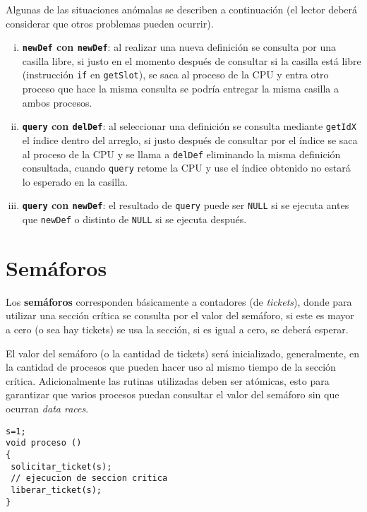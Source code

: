 Algunas de las situaciones anómalas se describen a continuación (el lector
deberá considerar que otros problemas pueden ocurrir).

\begin{enumerate}[i.]

\item \textbf{\texttt{newDef} con \texttt{newDef}}: al realizar una nueva
definición se consulta por una casilla libre, si justo en el momento después de
consultar si la casilla está libre (instrucción \texttt{if} en
\texttt{getSlot}), se saca al proceso de la CPU y entra otro proceso que hace la
misma consulta se podría entregar la misma casilla a ambos procesos.

\item \textbf{\texttt{query} con \texttt{delDef}}: al seleccionar una
definición se consulta mediante \texttt{getIdX} el índice dentro del arreglo, si
justo después de consultar por el índice se saca al proceso de la CPU y se llama
a \texttt{delDef} eliminando la misma definición consultada, cuando
\texttt{query} retome la CPU y use el índice obtenido no estará lo esperado en
la casilla.

\item \textbf{\texttt{query} con \texttt{newDef}}: el resultado de
\texttt{query} puede ser \texttt{NULL} si se ejecuta antes que \texttt{newDef} o
distinto de \texttt{NULL} si se ejecuta después.

\end{enumerate}

\section{Semáforos}
Los \textbf{semáforos} corresponden básicamente a contadores (de
\emph{tickets}), donde para utilizar una sección crítica se consulta por el
valor del semáforo, si este es mayor a cero (o sea hay tickets) se usa la
sección, si es igual a cero, se deberá esperar.

El valor del semáforo (o la cantidad de tickets) será inicializado,
generalmente, en la cantidad de procesos que pueden hacer uso al mismo tiempo de
la sección crítica. Adicionalmente las rutinas utilizadas deben ser atómicas,
esto para garantizar que varios procesos puedan consultar el valor del semáforo
sin que ocurran \emph{data races}.

\begin{lstlisting}
s=1;
void proceso ()
{
 solicitar_ticket(s);
 // ejecucion de seccion critica
 liberar_ticket(s);
}
\end{lstlisting}

